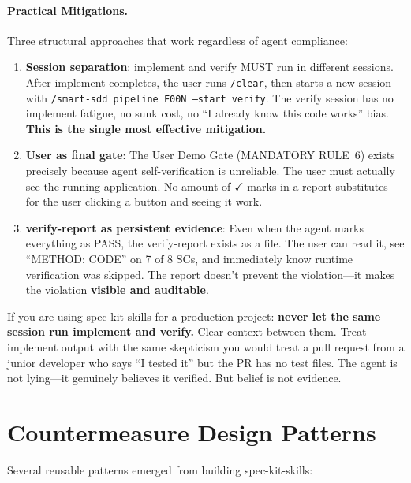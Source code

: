 \documentclass[11pt,a4paper,openright,twoside]{report}
\begin{document}
\paragraph{Practical Mitigations.}

Three structural approaches that work regardless of agent compliance:

\begin{enumerate}
  \item \textbf{Session separation}: implement and verify MUST run in different sessions. After implement completes, the user runs \texttt{/clear}, then starts a new session with \texttt{/smart-sdd pipeline F00N --start verify}. The verify session has no implement fatigue, no sunk cost, no ``I already know this code works'' bias. \textbf{This is the single most effective mitigation.}

  \item \textbf{User as final gate}: The User Demo Gate (MANDATORY RULE~6) exists precisely because agent self-verification is unreliable. The user must actually see the running application. No amount of $\checkmark$ marks in a report substitutes for the user clicking a button and seeing it work.

  \item \textbf{verify-report as persistent evidence}: Even when the agent marks everything as PASS, the verify-report exists as a file. The user can read it, see ``METHOD: CODE'' on 7 of 8 SCs, and immediately know runtime verification was skipped. The report doesn't prevent the violation---it makes the violation \textbf{visible and auditable}.
\end{enumerate}

\begin{tipbox}
If you are using spec-kit-skills for a production project: \textbf{never let the same session run implement and verify.} Clear context between them. Treat implement output with the same skepticism you would treat a pull request from a junior developer who says ``I tested it'' but the PR has no test files. The agent is not lying---it genuinely believes it verified. But belief is not evidence.
\end{tipbox}


\section{Countermeasure Design Patterns}

Several reusable patterns emerged from building spec-kit-skills:
\end{document}
